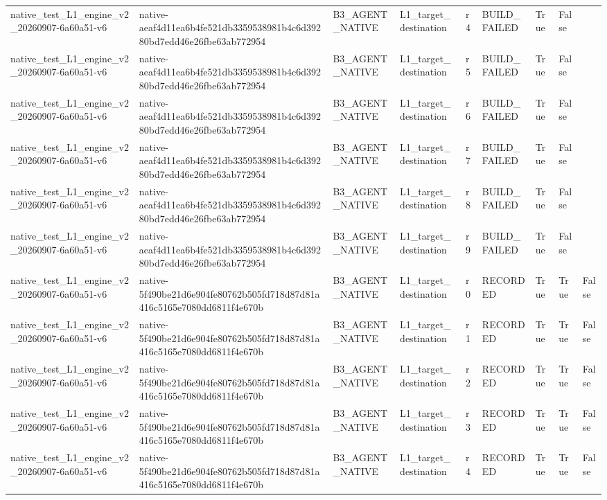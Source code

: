 \begin{tabular}{lllllllll}
native\_test\_L1\_engine\_v2\_20260907-6a60a51-v6 & native-aeaf4d11ea6b4fe521db3359538981b4c6d39280bd7edd46e26fbe63ab772954 & B3\_AGENT\_NATIVE & L1\_target\_destination & r4 & BUILD\_FAILED & True & False &  \\
native\_test\_L1\_engine\_v2\_20260907-6a60a51-v6 & native-aeaf4d11ea6b4fe521db3359538981b4c6d39280bd7edd46e26fbe63ab772954 & B3\_AGENT\_NATIVE & L1\_target\_destination & r5 & BUILD\_FAILED & True & False &  \\
native\_test\_L1\_engine\_v2\_20260907-6a60a51-v6 & native-aeaf4d11ea6b4fe521db3359538981b4c6d39280bd7edd46e26fbe63ab772954 & B3\_AGENT\_NATIVE & L1\_target\_destination & r6 & BUILD\_FAILED & True & False &  \\
native\_test\_L1\_engine\_v2\_20260907-6a60a51-v6 & native-aeaf4d11ea6b4fe521db3359538981b4c6d39280bd7edd46e26fbe63ab772954 & B3\_AGENT\_NATIVE & L1\_target\_destination & r7 & BUILD\_FAILED & True & False &  \\
native\_test\_L1\_engine\_v2\_20260907-6a60a51-v6 & native-aeaf4d11ea6b4fe521db3359538981b4c6d39280bd7edd46e26fbe63ab772954 & B3\_AGENT\_NATIVE & L1\_target\_destination & r8 & BUILD\_FAILED & True & False &  \\
native\_test\_L1\_engine\_v2\_20260907-6a60a51-v6 & native-aeaf4d11ea6b4fe521db3359538981b4c6d39280bd7edd46e26fbe63ab772954 & B3\_AGENT\_NATIVE & L1\_target\_destination & r9 & BUILD\_FAILED & True & False &  \\
native\_test\_L1\_engine\_v2\_20260907-6a60a51-v6 & native-5f490be21d6e904fe80762b505fd718d87d81a416c5165e7080dd6811f4e670b & B3\_AGENT\_NATIVE & L1\_target\_destination & r0 & RECORDED & True & True & False \\
native\_test\_L1\_engine\_v2\_20260907-6a60a51-v6 & native-5f490be21d6e904fe80762b505fd718d87d81a416c5165e7080dd6811f4e670b & B3\_AGENT\_NATIVE & L1\_target\_destination & r1 & RECORDED & True & True & False \\
native\_test\_L1\_engine\_v2\_20260907-6a60a51-v6 & native-5f490be21d6e904fe80762b505fd718d87d81a416c5165e7080dd6811f4e670b & B3\_AGENT\_NATIVE & L1\_target\_destination & r2 & RECORDED & True & True & False \\
native\_test\_L1\_engine\_v2\_20260907-6a60a51-v6 & native-5f490be21d6e904fe80762b505fd718d87d81a416c5165e7080dd6811f4e670b & B3\_AGENT\_NATIVE & L1\_target\_destination & r3 & RECORDED & True & True & False \\
native\_test\_L1\_engine\_v2\_20260907-6a60a51-v6 & native-5f490be21d6e904fe80762b505fd718d87d81a416c5165e7080dd6811f4e670b & B3\_AGENT\_NATIVE & L1\_target\_destination & r4 & RECORDED & True & True & False \\

\end{tabular}
